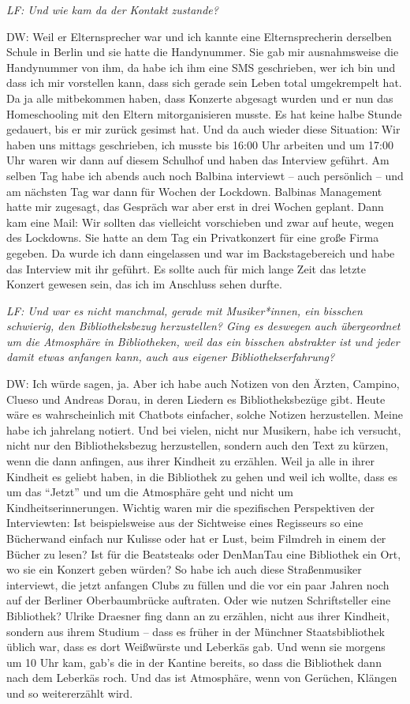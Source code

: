\documentclass[a4paper,
fontsize=11pt,
oneside,
numbers=noperiodatend,
parskip=half-,
bibliography=totoc,
final
]{scrartcl}
\begin{document}
\emph{LF: Und wie kam da der Kontakt zustande?}

DW: Weil er Elternsprecher war und ich kannte eine Elternsprecherin
derselben Schule in Berlin und sie hatte die Handynummer. Sie gab mir
ausnahmsweise die Handynummer von ihm, da habe ich ihm eine SMS
geschrieben, wer ich bin und dass ich mir vorstellen kann, dass sich
gerade sein Leben total umgekrempelt hat. Da ja alle mitbekommen haben,
dass Konzerte abgesagt wurden und er nun das Homeschooling mit den
Eltern mitorganisieren musste. Es hat keine halbe Stunde gedauert, bis
er mir zurück gesimst hat. Und da auch wieder diese Situation: Wir haben
uns mittags geschrieben, ich musste bis 16:00 Uhr arbeiten und um 17:00
Uhr waren wir dann auf diesem Schulhof und haben das Interview geführt.
Am selben Tag habe ich abends auch noch Balbina interviewt -- auch
persönlich -- und am nächsten Tag war dann für Wochen der Lockdown.
Balbinas Management hatte mir zugesagt, das Gespräch war aber erst in
drei Wochen geplant. Dann kam eine Mail: Wir sollten das vielleicht
vorschieben und zwar auf heute, wegen des Lockdowns. Sie hatte an dem
Tag ein Privatkonzert für eine große Firma gegeben. Da wurde ich dann
eingelassen und war im Backstagebereich und habe das Interview mit ihr
geführt. Es sollte auch für mich lange Zeit das letzte Konzert gewesen
sein, das ich im Anschluss sehen durfte.

\emph{LF: Und war es nicht manchmal, gerade mit Musiker*innen, ein
bisschen schwierig, den Bibliotheksbezug herzustellen? Ging es deswegen
auch übergeordnet um die Atmosphäre in Bibliotheken, weil das ein
bisschen abstrakter ist und jeder damit etwas anfangen kann, auch aus
eigener Bibliothekserfahrung?}

DW: Ich würde sagen, ja. Aber ich habe auch Notizen von den Ärzten,
Campino, Clueso und Andreas Dorau, in deren Liedern es Bibliotheksbezüge
gibt. Heute wäre es wahrscheinlich mit Chatbots einfacher, solche
Notizen herzustellen. Meine habe ich jahrelang notiert. Und bei vielen,
nicht nur Musikern, habe ich versucht, nicht nur den Bibliotheksbezug
herzustellen, sondern auch den Text zu kürzen, wenn die dann anfingen,
aus ihrer Kindheit zu erzählen. Weil ja alle in ihrer Kindheit es
geliebt haben, in die Bibliothek zu gehen und weil ich wollte, dass es
um das \enquote{Jetzt} und um die Atmosphäre geht und nicht um
Kindheitserinnerungen. Wichtig waren mir die spezifischen Perspektiven
der Interviewten: Ist beispielsweise aus der Sichtweise eines Regisseurs
so eine Bücherwand einfach nur Kulisse oder hat er Lust, beim Filmdreh
in einem der Bücher zu lesen? Ist für die Beatsteaks oder DenManTau eine
Bibliothek ein Ort, wo sie ein Konzert geben würden? So habe ich auch
diese Straßenmusiker interviewt, die jetzt anfangen Clubs zu füllen und
die vor ein paar Jahren noch auf der Berliner Oberbaumbrücke auftraten.
Oder wie nutzen Schriftsteller eine Bibliothek? Ulrike Draesner fing
dann an zu erzählen, nicht aus ihrer Kindheit, sondern aus ihrem Studium
-- dass es früher in der Münchner Staatsbibliothek üblich war, dass es
dort Weißwürste und Leberkäs gab. Und wenn sie morgens um 10 Uhr kam,
gab's die in der Kantine bereits, so dass die Bibliothek dann nach dem
Leberkäs roch. Und das ist Atmosphäre, wenn von Gerüchen, Klängen und so
weitererzählt wird.
\end{document}
